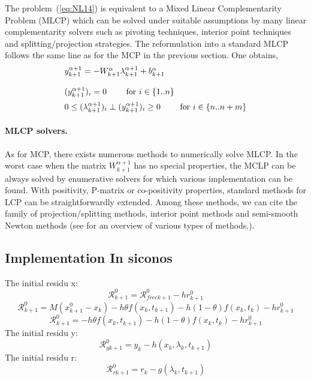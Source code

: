 The problem~(\ref{eq:NL14}) is equivalent to a Mixed Linear Complementarity Problem (MLCP) which can be solved under suitable assumptions by many linear complementarity solvers such as pivoting techniques, interior point techniques and splitting/projection strategies. The  reformulation into a standard MLCP follows the same line as for the MCP in the previous section. One obtains,
    \begin{equation}
      \begin{array}[l]{l}
        y^{\alpha+1}_{k+1} =   - W^{\alpha}_{k+1}  \lambda^{\alpha+1}_{k+1} + b^{\alpha}_{k+1}
        \\ \\
        (y^{\alpha+1}_{k+1})_i  = 0 \qquad \textrm{ for } i \in \{ 1..n\}\\[2mm]
        0 \leq  (\lambda^{\alpha+1}_{k+1})_i\perp (y^{\alpha+1}_{k+1})_i \geq 0 \qquad \textrm{ for } i \in \{ n..n+m\}\\
      \end{array}
      \label{eq:MLCP1} 
    \end{equation}

\paragraph{MLCP solvers.} As for MCP, there exists numerous methods to numerically solve MLCP. In the worst case when the matrix $W^{\alpha+1}_{k+1}$ has no special properties, the MCLP can be always solved by enumerative solvers for which various implementation can be found. With positivity, P-matrix  or co-positivity properties, standard methods for LCP\cite{Cottle.Pang.ea1992} can be straightforwardly extended. Among these methods, we can cite the family of projection/splitting methods, interior point methods and semi-smooth Newton methods (see \cite{acary2008} for an overview of various types of methods.).

\subsection{Implementation In siconos}

The initial residu x:
\[\mathcal   R^{0}_{k+1}= \mathcal   R^{0}_{free k+1}-hr^{0}_{k+1}\]
\[\mathcal   R^{0}_{k+1}= M(x^{0}_{k+1} - x_k) -h\theta f(x_k,t_{k+1})-h(1-\theta)f(x_k,t_k)-hr^{0}_{k+1}\]
\[\mathcal   R^{0}_{k+1}= -h\theta f(x_k,t_{k+1})-h(1-\theta)f(x_k,t_k)-hr^{0}_{k+1}\]
The initial residu y:
\[\mathcal   R^{0}_{y k+1} =y_k -h(x_k,\lambda _k,t_{k+1})\]
The initial residu r:
\[\mathcal   R^{0}_{r k+1} =r_k -g(\lambda _k,t_{k+1})\]

